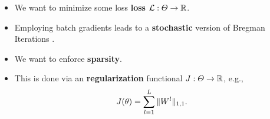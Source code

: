 {{\begin{minipage}[t]{\colwidth}
%
\begin{minipage}[t]{.48\textwidth}%
\vskip0pt%
\begin{itemize}%
\small%
\item We want to minimize some loss \textcolor{BaseDarkColor}{\textbf{loss}} $\mathcal{L}:\Theta\to\mathbb{R}$.
\item Employing batch gradients leads to a \textcolor{BaseDarkColor}{\textbf{stochastic}} version of Bregman Iterations \cite{yin2008bregman}.
\end{itemize}
\end{minipage}%
%
\hfill%
%
\begin{minipage}[t]{.48\textwidth}%
\vskip0pt%
\begin{itemize}%
\small%
\item We want to enforce \textcolor{BaseDarkColor}{\textbf{sparsity}}.
\item This is done via an \textcolor{BaseDarkColor}{\textbf{regularization}} functional $J:\Theta\to\mathbb{R}$, e.g.,
%
\begin{align*}
J(\theta) &= \sum_{l=1}^L \Vert W^l\Vert_{1,1}.
\end{align*}
\end{itemize}%
\end{minipage}%
\vspace{1cm}

%
\begin{minipage}[t]{\textwidth}%
\end{minipage}
\end{minipage}}}
